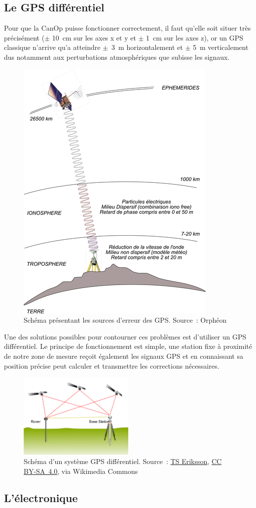 \subsection{Le GPS différentiel}
\label{ssec_Gps_differenciel}
Pour que la CanOp puisse fonctionner correctement, il faut qu'elle soit situer très précisément ($\pm$ 10~cm sur les axes x et y et $\pm$ 1~cm sur les axes z), or un GPS classique n'arrive qu’a atteindre $\pm$~3~m horizontalement et $\pm$ 5~m verticalement dus notamment aux perturbations atmosphériques que subisse les signaux. 
\begin{figure}
    \centering
    \includegraphics[height=0.5\textwidth]{img/she/GPS-mode-Naturel-5-10m.png}
    \caption[Source d'erreur des GPS]{Schéma présentant les sources d'erreur des GPS. Source~: Orphéon}
    \label{fig_GPS_error_source}
\end{figure}

Une des solutions possibles pour contourner ces problèmes est d'utiliser un GPS différentiel. Le principe de fonctionnement est simple, une station fixe à proximité de notre zone de mesure reçoit également les signaux GPS et en connaissant sa position précise peut calculer et transmettre les corrections nécessaires. \cite{site:GPS_diff}
\begin{figure}
    \centering
    \includegraphics[width=0.5\textwidth]{img/she/Real_time_kinematic.png}
    \caption[Shema d'un systeme GPS differenciel]{Schéma d'un système GPS différentiel. Source~: \href{https://commons.wikimedia.org/wiki/File:Real_time_kinematic.svg}{TS Eriksson}, \href{https://creativecommons.org/licenses/by-sa/4.0}{CC BY-SA~4.0}, via Wikimedia Commons}
    \label{fig_RTK}
\end{figure}

\subsection{L'électronique}

    